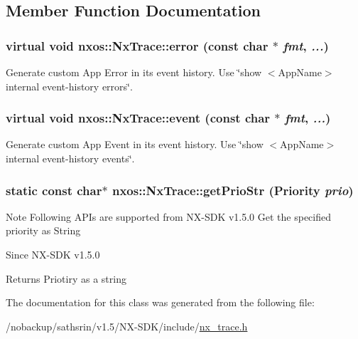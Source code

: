 \subsection{Member Function Documentation}
\hypertarget{classnxos_1_1NxTrace_afc0240b6b9a291729836ffb2fbeef8a4}{
\subsubsection[{error}]{\setlength{\rightskip}{0pt plus 5cm}virtual void nxos::NxTrace::error (const char $\ast$ {\em fmt}, \/   {\em ...})}}
\label{classnxos_1_1NxTrace_afc0240b6b9a291729836ffb2fbeef8a4}
Generate custom App Error in its event history. Use \char`\"{}show $<$AppName$>$ internal event-\/history errors\char`\"{}. \hypertarget{classnxos_1_1NxTrace_a22e5e2fff39fae68fba3051dc2720621}{
\subsubsection[{event}]{\setlength{\rightskip}{0pt plus 5cm}virtual void nxos::NxTrace::event (const char $\ast$ {\em fmt}, \/   {\em ...})}}
\label{classnxos_1_1NxTrace_a22e5e2fff39fae68fba3051dc2720621}
Generate custom App Event in its event history. Use \char`\"{}show $<$AppName$>$ internal event-\/history events\char`\"{}. \hypertarget{classnxos_1_1NxTrace_a583b8a49a2111e4e4b8ef2f2eeaa4620}{
\subsubsection[{getPrioStr}]{\setlength{\rightskip}{0pt plus 5cm}static const char$\ast$ nxos::NxTrace::getPrioStr ({\bf Priority} {\em prio})}}
\label{classnxos_1_1NxTrace_a583b8a49a2111e4e4b8ef2f2eeaa4620}
\begin{DoxyNote}{Note}
Following APIs are supported from NX-\/SDK v1.5.0 Get the specified priority as String
\end{DoxyNote}
\begin{DoxySince}{Since}
NX-\/SDK v1.5.0
\end{DoxySince}
\begin{DoxyReturn}{Returns}
Priotiry as a string 
\end{DoxyReturn}


The documentation for this class was generated from the following file:\begin{DoxyCompactItemize}
\item 
/nobackup/sathsrin/v1.5/NX-\/SDK/include/\hyperlink{nx__trace_8h}{nx\_\-trace.h}\end{DoxyCompactItemize}
